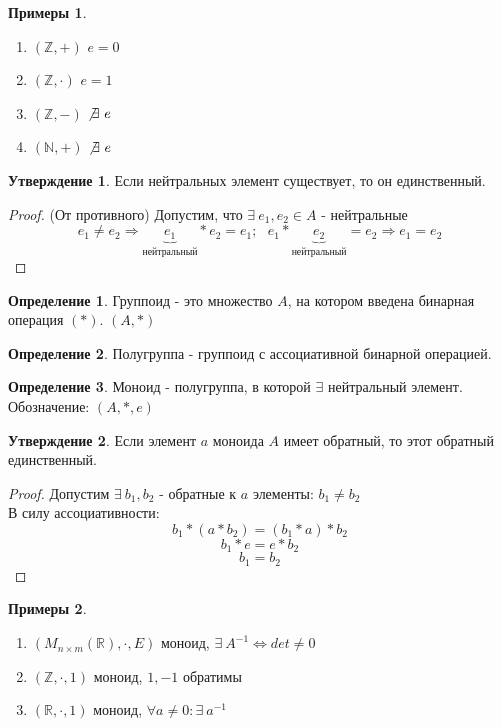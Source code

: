 \documentclass[a4paper, 12pt]{article}
\newcommand{\R}{\mathbb R}
\newcommand{\Z}{\mathbb Z}
\newcommand{\N}{\mathbb N}
\newcommand\tab[1][.5cm]{\hspace*{#1}}
\theoremstyle{definition}
\newtheorem*{definition}{Определение}
\newtheorem*{subtheorem}{Утверждение}
\newtheorem*{example}{Примеры}
\begin{document}
  \begin{example}
    \begin{enumerate} \tab
      \item $(\Z, +)$ $e=0$  
      \item $(\Z, \cdot)$ $e=1$ 
      \item $(\Z, -)$ $\not \exists \ e$ 
      \item $(\N, +)$ $\not \exists \ e$ 
    \end{enumerate}
  \end{example}
  \begin{subtheorem}
    Если нейтральных элемент существует, то он единственный. 
  \end{subtheorem} 
  \begin{proof}
    (От противного) Допустим, что $\exists \ e_1,e_2 \in A$ - нейтральные
    $$e_1 \not = e_2 \Longrightarrow \underbrace{e_1}_{\text{нейтральный}}* e_2 = e_1; \ \ \ e_1 * \underbrace{e_2}_{\text{нейтральный}}= e_2 \Longrightarrow e_1 = e_2$$ 
  \end{proof} 
  \begin{definition}
    Группоид - это множество $A$, на котором введена бинарная операция $(*)$. $(A,*)$  
  \end{definition} 
  \begin{definition}
    Полугруппа - группоид с ассоциативной бинарной операцией.
  \end{definition} 
  \begin{definition}
    Моноид - полугруппа, в которой $\exists $ нейтральный элемент.\\ Обозначение: $(A,*,e)$ 
  \end{definition} 
  \begin{subtheorem}
    Если элемент $a$ моноида $A$ имеет обратный, то этот обратный единственный. 
  \end{subtheorem}
  \begin{proof}
    Допустим $\exists \ b_1,b_2$ - обратные к $a$ элементы: $b_1 \not = b_2$ \\
    В силу ассоциативности:
    $$b_1 * (a * b_2) = (b_1 * a) * b_2$$
    $$b_1 * e = e * b_2$$ 
    $$b_1 = b_2$$ 
  \end{proof} 
  \begin{example}
    \begin{enumerate} \tab
      \item $(M_{n \times m}(\R), \cdot, E)$ моноид, $\exists \ A^{-1} \Longleftrightarrow det \not = 0$ 
      \item $(\Z, \cdot, 1)$ моноид, $1, -1$ обратимы  
      \item $(\R, \cdot, 1)$ моноид, $\forall a \not =0:  \exists \ a^{-1}$ 
    \end{enumerate}
  \end{example}
\end{document}
